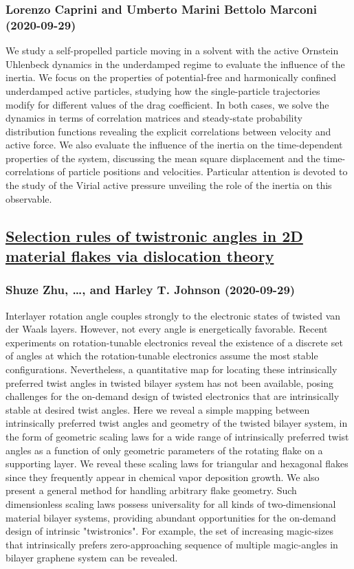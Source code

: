 \subsubsection*{Lorenzo Caprini and Umberto Marini Bettolo Marconi (2020-09-29)}
We study a self-propelled particle moving in a solvent with the active
Ornstein Uhlenbeck dynamics in the underdamped regime to evaluate the influence
of the inertia. We focus on the properties of potential-free and harmonically
confined underdamped active particles, studying how the single-particle
trajectories modify for different values of the drag coefficient. In both
cases, we solve the dynamics in terms of correlation matrices and steady-state
probability distribution functions revealing the explicit correlations between
velocity and active force. We also evaluate the influence of the inertia on the
time-dependent properties of the system, discussing the mean square
displacement and the time-correlations of particle positions and velocities.
Particular attention is devoted to the study of the Virial active pressure
unveiling the role of the inertia on this observable.

\subsection*{\href{http://arxiv.org/abs/2009.14031v1}{Selection rules of twistronic angles in 2D material flakes via  dislocation theory}}
\subsubsection*{Shuze Zhu, \dots, and Harley T. Johnson (2020-09-29)}
Interlayer rotation angle couples strongly to the electronic states of
twisted van der Waals layers. However, not every angle is energetically
favorable. Recent experiments on rotation-tunable electronics reveal the
existence of a discrete set of angles at which the rotation-tunable electronics
assume the most stable configurations. Nevertheless, a quantitative map for
locating these intrinsically preferred twist angles in twisted bilayer system
has not been available, posing challenges for the on-demand design of twisted
electronics that are intrinsically stable at desired twist angles. Here we
reveal a simple mapping between intrinsically preferred twist angles and
geometry of the twisted bilayer system, in the form of geometric scaling laws
for a wide range of intrinsically preferred twist angles as a function of only
geometric parameters of the rotating flake on a supporting layer. We reveal
these scaling laws for triangular and hexagonal flakes since they frequently
appear in chemical vapor deposition growth. We also present a general method
for handling arbitrary flake geometry. Such dimensionless scaling laws possess
universality for all kinds of two-dimensional material bilayer systems,
providing abundant opportunities for the on-demand design of intrinsic
"twistronics". For example, the set of increasing magic-sizes that
intrinsically prefers zero-approaching sequence of multiple magic-angles in
bilayer graphene system can be revealed.

